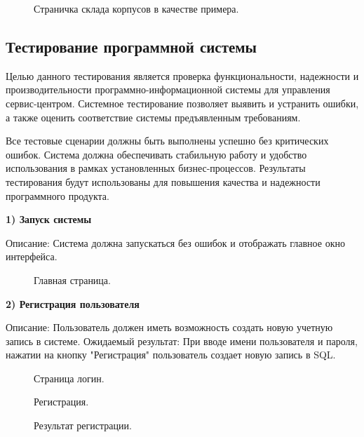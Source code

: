 \begin{figure}[ht]
	\caption{Страничка склада корпусов в качестве примера.}
	\label{storedf:image}
\end{figure}
\clearpage

\subsection{Тестирование программной системы}
Целью данного тестирования является проверка функциональности, надежности и производительности программно-информационной системы для управления сервис-центром.
Системное тестирование позволяет выявить и устранить ошибки, а также оценить соответствие системы предъявленным требованиям.

Все тестовые сценарии должны быть выполнены успешно без критических ошибок. Система должна обеспечивать стабильную работу и удобство использования в рамках установленных бизнес-процессов. Результаты тестирования будут использованы для повышения качества и надежности программного продукта.

\textbf{1) Запуск системы}

Описание: Система должна запускаться без ошибок и отображать главное окно интерфейса.

\begin{figure}[ht]
	\caption{Главная страница.}
	\label{storedf:index0}
\end{figure}

\newpage

\textbf{2) Регистрация пользователя}

Описание: Пользователь должен иметь возможность создать новую учетную запись в системе.
Ожидаемый результат:  При вводе имени пользователя и пароля, нажатии на кнопку "Регистрация" пользователь создает новую запись в SQL.

\begin{figure}[ht]
	\caption{Страница логин.}
	\label{storedf:login0}
\end{figure}

\begin{figure}[ht]
	\caption{Регистрация.}
	\label{storedf:loginus}
\end{figure}

\begin{figure}[ht]
	\caption{Результат регистрации.}
	\label{storedf:loginc}
\end{figure}

